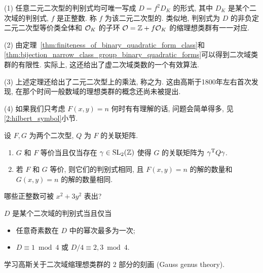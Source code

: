 \begin{remark}
(1) 任意二元二次型的判别式均可唯一写成 $D=f^2D_K$ 的形式, 其中 $D_K$ 是某个二次域的判别式, $f$ 是正整数. 称 $f$ 为该二元二次型的. 类似地, 判别式为 $D$ 的非负定二元二次型等价类全体和 ${\mathcal{O}}_K$ 的子环 ${\mathcal{O}}={\mathbb{Z}}+f{\mathcal{O}}_K$ 的缩理想类群有一一对应.

(2) 由定理~\ref{thm:finiteness_of_binary_quadratic_form_class}和\ref{thm:bijection_narrow_class_group_binary_quadratic_forms}可以得到二次域类群的有限性. 实际上, 这还给出了虚二次域类数的一个有效算法.

(3) 上述定理还给出了二元二次型上的乘法, 称之为. 这由高斯于1800年左右首次发现, 在那个时间一般数域的理想类群的概念还尚未被提出.

(4) 如果我们只考虑 $F(x,y)=n$ 何时有有理解的话, 问题会简单得多, 见\ref{2:hilbert_symbol}小节.
\end{remark}


\begin{exercise}
设 $F,G$ 为两个二次型, $Q$ 为 $F$ 的关联矩阵.
\begin{enumerate}
  \item $G$ 和 $F$ 等价当且仅当存在 $\gamma\in{\mathrm{SL}}_2({\mathbb{Z}})$ 使得 $G$ 的关联矩阵为 $\gamma^{\mathrm{T}} Q\gamma$.
  \item 若 $F$ 和 $G$ 等价, 则它们的判别式相同, 且 $F(x,y)=n$ 的解的数量和 $G(x,y)=n$ 的解的数量相同.
\end{enumerate}
\end{exercise}

\begin{exercise}
哪些正整数可被 $x^2+3y^2$ 表出?
\end{exercise}

\begin{exercise}
$D$ 是某个二次域的判别式当且仅当
\begin{itemize}
\item 任意奇素数在 $D$ 中的幂次最多为一次;
\item $D\equiv 1\bmod 4$ 或 $D/4\equiv 2,3\bmod 4$.
\end{itemize}
\end{exercise}

\begin{exercise}
学习高斯关于二次域缩理想类群的 $2$ 部分的刻画 (Gauss genus theory).
\end{exercise}

